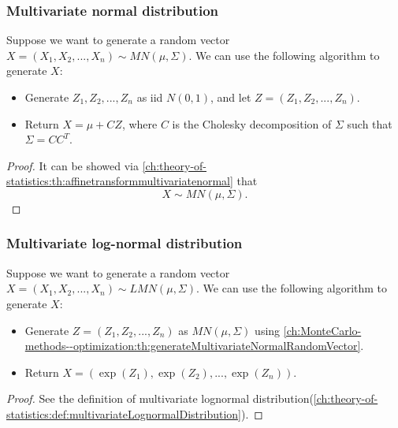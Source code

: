 \begin{refsection}
\subsubsection{Multivariate normal distribution}
\begin{lemma}\label{ch:MonteCarlo-methods--optimization:th:generateMultivariateNormalRandomVector}
Suppose we want to generate a random vector $X=(X_1,X_2,...,X_n)\sim MN(\mu, \Sigma)$. We can use the following algorithm to generate $X$:
\begin{itemize}
	\item Generate $Z_1,Z_2,...,Z_n$ as iid $N(0,1)$, and let $Z = (Z_1,Z_2,...,Z_n).$
	\item Return $X= \mu + CZ$, where $C$ is the Cholesky decomposition of $\Sigma$ such that $\Sigma = CC^T$.
\end{itemize}	
\end{lemma}
\begin{proof}
It can be showed via \autoref{ch:theory-of-statistics:th:affinetransformmultivariatenormal} that
$$X\sim MN(\mu, \Sigma).$$
\end{proof}


\subsubsection{Multivariate log-normal distribution}
\begin{lemma}
Suppose we want to generate a random vector $X=(X_1,X_2,...,X_n)\sim LMN(\mu, \Sigma)$. We can use the following algorithm to generate $X$:
\begin{itemize}
	\item Generate $Z=(Z_1,Z_2,...,Z_n)$ as $MN(\mu,\Sigma)$ using \autoref{ch:MonteCarlo-methods--optimization:th:generateMultivariateNormalRandomVector}.
	\item Return $X= (\exp(Z_1),\exp(Z_2),...,\exp(Z_n))$.
\end{itemize}	
\end{lemma}
\begin{proof}
See the definition of multivariate lognormal distribution(\autoref{ch:theory-of-statistics:def:multivariateLognormalDistribution}).
\end{proof}


\end{refsection}

